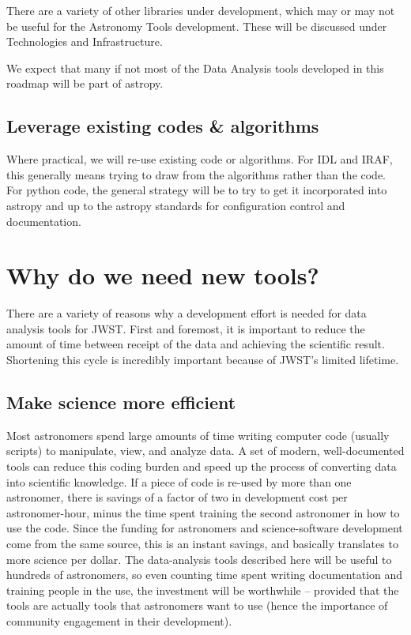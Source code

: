 \documentclass[letterpaper,10pt,english]{sphinxmanual}
\begin{document}
There are a variety of other libraries under development, which may or may not
be useful for the Astronomy Tools development. These will be discussed under Technologies and
Infrastructure.

We expect that many if not most of the Data Analysis tools developed in
this roadmap will be part of astropy.


\section{Leverage existing codes \& algorithms}
\label{intro:leverage-existing-codes-algorithms}
Where practical, we will re-use existing code or algorithms. For IDL and IRAF,
this generally means trying to draw from the algorithms rather than the code.
For python code, the general strategy will be to try to get it incorporated
into astropy and up to the astropy standards for configuration control and
documentation.


\chapter{Why do we need new tools?}
\label{intro:why-do-we-need-new-tools}
There are a variety of reasons why a development effort is needed for data
analysis tools for JWST. First and foremost, it is important to reduce the
amount of time between receipt of the data and achieving the scientific result.
Shortening this cycle is incredibly important because of JWST's limited lifetime.


\section{Make science more efficient}
\label{intro:make-science-more-efficient}
Most astronomers spend large amounts of time writing computer code (usually
scripts) to manipulate, view, and analyze data. A set of modern, well-documented
tools can reduce this coding burden and speed up the process of converting data into
scientific knowledge.  If a piece of code is re-used by more than one
astronomer, there is savings of a factor of two in development
cost per astronomer-hour, minus the time spent training the second astronomer
in how to use the code. Since the funding for astronomers and science-software
development come from the same source, this is an instant savings, and basically
translates to more science per dollar. The data-analysis tools described
here will be useful to hundreds of astronomers, so even counting time spent
writing documentation and training people in the use, the investment will
be worthwhile -- provided that the tools are actually tools that astronomers
want to use (hence the importance of community engagement in their development).
\end{document}
